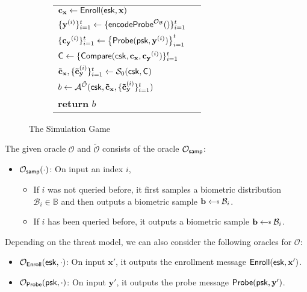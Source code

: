 \begin{figure}[h]
\begin{center}
\begin{subfigure}[t]{0.49\textwidth}
\begin{tabular}{l c}
			$\mathbf{c_x} \gets {\sf Enroll}({\sf esk}, \mathbf{x})$ \\

			$\{\mathbf{y}^{(i)}\}_{i=1}^t \gets \{{\sf encodeProbe}^{\mathcal{O}_{\mathcal{B}}}()\}_{i=1}^t $ \\
			
			$\{ \mathbf{c_y}^{(i)} \}_{i=1}^t \gets \left\{ {\sf Probe}( {\sf psk}, \mathbf{y}^{(i)} ) \right \}_{i=1}^t$ \\

			${\sf C} \gets \{ {\sf Compare}({\sf csk}, \mathbf{c_x}, \mathbf{c_y}^{(i)}) \}_{i=1}^t$ \\

			$\mathbf{\tilde c_x}, \{\mathbf{\tilde c_y}^{(i)}\}_{i=1}^t \gets \mathcal{S}_0( {\sf csk}, {\sf C} )$ \\

			$b \gets \mathcal{A}^\mathcal{\tilde O} ({\sf csk}, \mathbf{\tilde c_x}, \{ \mathbf{\tilde c_y}^{(i)} \}_{i=1}^t )$ \\

			\textbf{return} $b$
			
		\end{tabular}
		\end{subfigure}
	\end{center}
	\caption{The Simulation Game}
	\label{fig:sim_game}
\end{figure}

The given oracle $\mathcal{O}$ and $\mathcal{\tilde O}$ consists of the oracle $\mathcal{O}_{\sf samp}$:

\begin{itemize}
	\item $\mathcal{O}_{\sf samp}(\cdot)$: On input an index $i$,
	\begin{itemize}
		\item If $i$ was not queried before, it first samples a biometric distribution $\mathcal{B}_i \in \mathbb{B}$ and then outputs a biometric sample $\mathbf{b} \getsdollar \mathcal{B}_i$.
		\item If $i$ has been queried before, it outputs a biometric sample $\mathbf{b} \getsdollar \mathcal{B}_i$.
	\end{itemize}

\end{itemize}

Depending on the threat model, we can also consider the following oracles for $\mathcal{O}$:

\begin{itemize}
	\item $\mathcal{O}_{\sf Enroll}({\sf esk}, \cdot)$: On input $\mathbf{x'}$, it outputs the enrollment message ${\sf Enroll}({\sf esk}, \mathbf{x'})$.

	\item $\mathcal{O}_{\sf Probe}({\sf psk}, \cdot)$: On input $\mathbf{y'}$, it outputs the probe message ${\sf Probe}({\sf psk}, \mathbf{y'})$.
\end{itemize}

